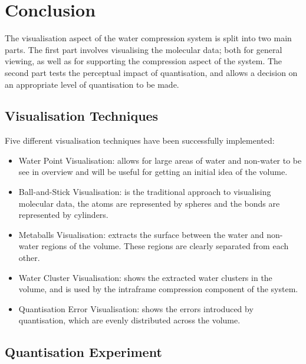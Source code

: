 \chapter{Conclusion}
\label{cha:conclusion}

The visualisation aspect of the water compression system is split into two main
parts. The first part involves visualising the molecular data; both for general
viewing, as well as for supporting the compression aspect of the system. The
second part tests the perceptual impact of quantisation, and allows a decision
on an appropriate level of quantisation to be made.

\section{Visualisation Techniques}
\label{sec:conclusion_visualisation}

Five different visualisation techniques have been successfully implemented:
\begin{itemize}

  \item Water Point Visualisation: allows for large areas of water and
  non-water to be see in overview and will be useful for getting an initial
  idea of the volume.

  \item Ball-and-Stick Visualisation: is the traditional approach to
  visualising molecular data, the atoms are represented by spheres and the
  bonds are represented by cylinders.

  \item Metaballs Visualisation: extracts the surface between the water and
  non-water regions of the volume. These regions are clearly separated from
  each other.

  \item Water Cluster Visualisation: shows the extracted water clusters in the
  volume, and is used by the intraframe compression component of the system.

  \item Quantisation Error Visualisation: shows the errors introduced by
  quantisation, which are evenly distributed across the volume.

\end{itemize}


\section{Quantisation Experiment}
\label{sec:conclustion_experiment}

